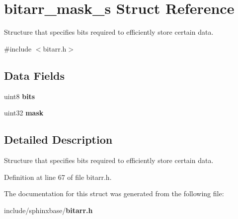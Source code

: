 \section{bitarr\+\_\+mask\+\_\+s Struct Reference}
\label{structbitarr__mask__s}


Structure that specifies bits required to efficiently store certain data.  




{\ttfamily \#include $<$bitarr.\+h$>$}

\subsection*{Data Fields}
\begin{DoxyCompactItemize}
\item 
uint8 {\bfseries bits}\label{structbitarr__mask__s_a47b05f707efd5233f021bb1276c79b7a}

\item 
uint32 {\bfseries mask}\label{structbitarr__mask__s_a034b318c56cbc15befef989a2521623c}

\end{DoxyCompactItemize}


\subsection{Detailed Description}
Structure that specifies bits required to efficiently store certain data. 

Definition at line 67 of file bitarr.\+h.



The documentation for this struct was generated from the following file\+:\begin{DoxyCompactItemize}
\item 
include/sphinxbase/{\bf bitarr.\+h}\end{DoxyCompactItemize}
